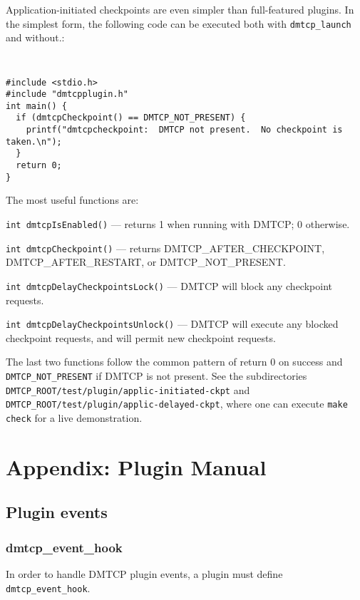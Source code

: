 \documentclass{article}
\begin{document}
Application-initiated checkpoints are even simpler than full-featured
plugins.  In the simplest form, the following code can be executed both
with {\tt dmtcp\_launch} and without.:

{\tt
\begin{verbatim}
#include <stdio.h>
#include "dmtcpplugin.h"
int main() {
  if (dmtcpCheckpoint() == DMTCP_NOT_PRESENT) {
    printf("dmtcpcheckpoint:  DMTCP not present.  No checkpoint is taken.\n");
  }
  return 0;
}
\end{verbatim}
}

The most useful functions are:
\begin{list}{}{\leftmargin=3em \itemindent=-2em}
\item
  {\tt int dmtcpIsEnabled()} --- returns 1 when running with DMTCP; 0 otherwise.
\item
  {\tt int dmtcpCheckpoint()} --- returns DMTCP\_AFTER\_CHECKPOINT,
                                 DMTCP\_AFTER\_RESTART, or DMTCP\_NOT\_PRESENT.
\item
  {\tt int dmtcpDelayCheckpointsLock()} --- DMTCP will block any
				 checkpoint requests.
\item
  {\tt int dmtcpDelayCheckpointsUnlock()} --- DMTCP will execute any blocked
                checkpoint requests, and will permit new checkpoint requests.
\end{list}

The last two functions follow the common pattern of return 0 on success
and {\tt DMTCP\_NOT\_PRESENT} if DMTCP is not present.
See the subdirectories
{\tt DMTCP\_ROOT/test/plugin/applic-initiated-ckpt}
and
{\tt DMTCP\_ROOT/test/plugin/applic-delayed-ckpt}, where one can execute
{\tt make check} for a live demonstration.

\appendix
\section{Appendix:  Plugin Manual}
\subsection{Plugin events}

\subsubsection{dmtcp\_event\_hook}

In order to handle DMTCP plugin events, a plugin must
define {\tt dmtcp\_event\_hook}.
\end{document}
